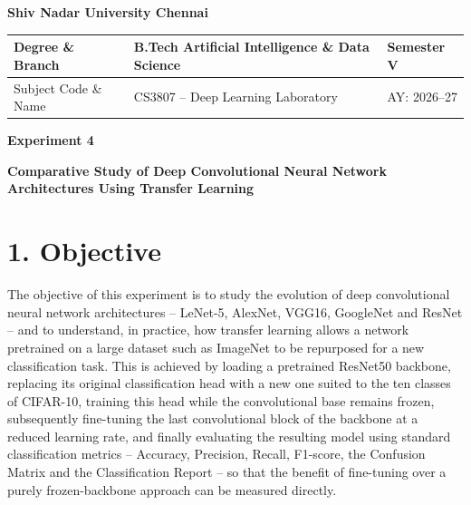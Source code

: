 \documentclass[11pt,a4paper]{article}
\begin{document}
\raggedbottom

\setlength{\textfloatsep}{10pt}
\setlength{\floatsep}{8pt}
\setlength{\intextsep}{8pt}


\begin{center}

{\Large \textbf{Shiv Nadar University Chennai}}

\vspace{0.3cm}

\begin{tabular}{|p{4cm}|p{8cm}|p{2cm}|}
\hline
Degree \& Branch &
B.Tech Artificial Intelligence \& Data Science &
Semester V\\
\hline
Subject Code \& Name &
CS3807 -- Deep Learning Laboratory &
AY: 2026--27\\
\hline
\end{tabular}

\vspace{0.7cm}

{\Large \textbf{Experiment 4}}

\vspace{0.2cm}

{\large \textbf{Comparative Study of Deep Convolutional Neural Network Architectures Using Transfer Learning}}

\end{center}

\section*{1. Objective}

The objective of this experiment is to study the evolution of deep convolutional neural network architectures -- LeNet-5, AlexNet, VGG16, GoogleNet and ResNet -- and to understand, in practice, how transfer learning allows a network pretrained on a large dataset such as ImageNet to be repurposed for a new classification task. This is achieved by loading a pretrained ResNet50 backbone, replacing its original classification head with a new one suited to the ten classes of CIFAR-10, training this head while the convolutional base remains frozen, subsequently fine-tuning the last convolutional block of the backbone at a reduced learning rate, and finally evaluating the resulting model using standard classification metrics -- Accuracy, Precision, Recall, F1-score, the Confusion Matrix and the Classification Report -- so that the benefit of fine-tuning over a purely frozen-backbone approach can be measured directly.
\end{document}
